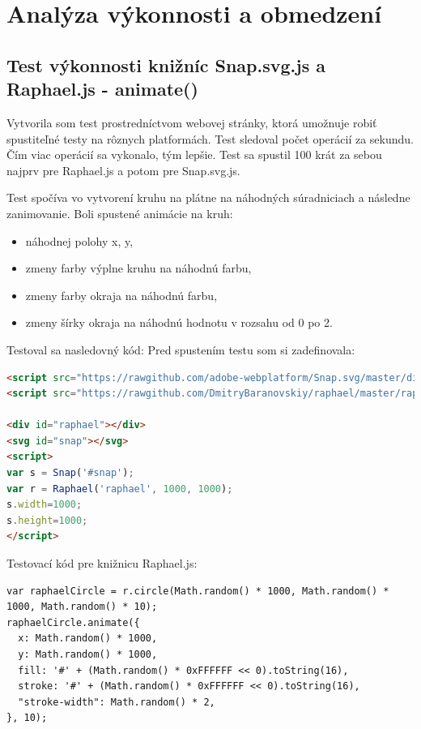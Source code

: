 \chapter{Analýza výkonnosti a obmedzení }


\section{Test výkonnosti knižníc Snap.svg.js a Raphael.js - animate()}

Vytvorila som test prostredníctvom webovej stránky, ktorá umožnuje robiť spustiteľné testy na rôznych platformách. Test sledoval počet operácií za sekundu. Čím viac operácií sa vykonalo, tým lepšie. Test sa spustil 100 krát za sebou najprv pre Raphael.js a potom pre Snap.svg.js. 
 


Test spočíva vo vytvorení kruhu na plátne na náhodných súradniciach a následne zanimovanie. Boli spustené animácie na kruh: 
\begin{itemize} \item náhodnej polohy x, y, 
\item zmeny farby výplne kruhu na náhodnú farbu, 
\item zmeny farby okraja na náhodnú farbu, 
\item zmeny šírky okraja na náhodnú hodnotu v rozsahu od 0 po 2. 
\end{itemize}
Testoval sa nasledovný kód: 
Pred spustením testu som si zadefinovala: 
\begin{lstlisting}[language = html]
<script src="https://rawgithub.com/adobe-webplatform/Snap.svg/master/dist/snap.svg.js"></script>
<script src="https://rawgithub.com/DmitryBaranovskiy/raphael/master/raphael.js"></script>

<div id="raphael"></div>
<svg id="snap"></svg>
<script>
var s = Snap('#snap');
var r = Raphael('raphael', 1000, 1000);
s.width=1000;
s.height=1000;
</script>
\end{lstlisting}

Testovací kód pre knižnicu Raphael.js:
\begin{lstlisting}
var raphaelCircle = r.circle(Math.random() * 1000, Math.random() * 1000, Math.random() * 10);
raphaelCircle.animate({
  x: Math.random() * 1000,
  y: Math.random() * 1000,
  fill: '#' + (Math.random() * 0xFFFFFF << 0).toString(16),
  stroke: '#' + (Math.random() * 0xFFFFFF << 0).toString(16),
  "stroke-width": Math.random() * 2,
}, 10);
\end{lstlisting}

